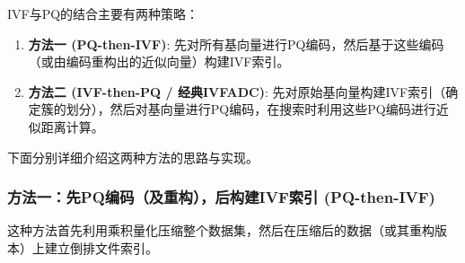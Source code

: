 \documentclass[a4paper]{article}
\begin{document}
	IVF与PQ的结合主要有两种策略：
	\begin{enumerate}
		\item \textbf{方法一 (PQ-then-IVF)}: 先对所有基向量进行PQ编码，然后基于这些编码（或由编码重构出的近似向量）构建IVF索引。
		\item \textbf{方法二 (IVF-then-PQ / 经典IVFADC)}: 先对原始基向量构建IVF索引（确定簇的划分），然后对基向量进行PQ编码，在搜索时利用这些PQ编码进行近似距离计算。
	\end{enumerate}
	下面分别详细介绍这两种方法的思路与实现。
	
	\subsubsection{方法一：先PQ编码（及重构），后构建IVF索引 (PQ-then-IVF)}
	这种方法首先利用乘积量化压缩整个数据集，然后在压缩后的数据（或其重构版本）上建立倒排文件索引。
	
\end{document}
